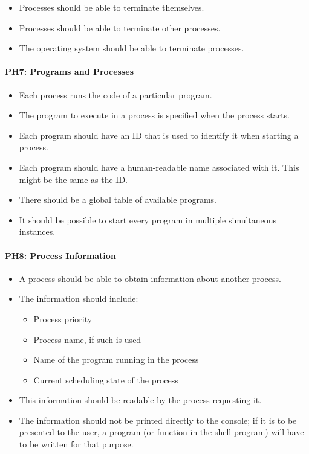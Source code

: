\begin{itemize}
  \item Processes should be able to terminate themselves.
  \item  Processes should be able to terminate other processes.
  \item  The operating system should be able to terminate processes.
\end{itemize}

\paragraph{PH7: Programs and Processes}
\label{pg:ph7}

\begin{itemize}
  \item Each process runs the code of a particular program.
  \item  The program to execute in a process is specified when the process starts.
  \item  Each program should have an ID that is used to identify it when starting a process.
  \item  Each program should have a human-readable name associated with it. This might be the same as the ID.
  \item  There should be a global table of available programs.
  \item  It should be possible to start every program in multiple simultaneous instances.
\end{itemize}

\paragraph{PH8: Process Information}
\label{pg:ph8}

\begin{itemize}
  \item A process should be able to obtain information about another process.
  \item  The information should include:
	 \begin{itemize}
		\item  Process priority
		\item  Process name, if such is used
		\item  Name of the program running in the process
		\item  Current scheduling state of the process
	 \end{itemize}
  \item  This information should be readable by the process requesting it.
  \item  The information should not be printed directly to the console; if it is to be presented to the user, a program (or function in the shell program) will have to be written for that purpose.
\end{itemize}

